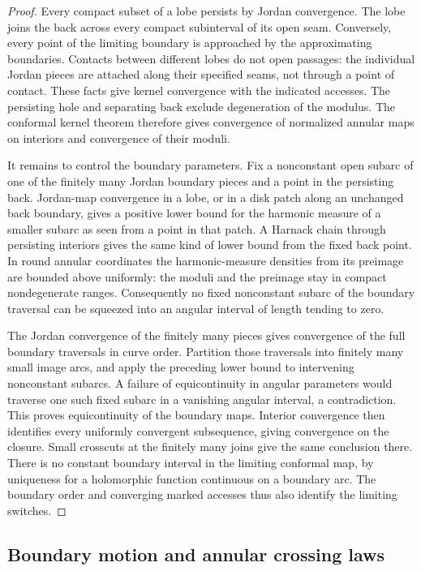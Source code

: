 \begin{proof}
Every compact subset of a lobe persists by Jordan convergence.  The lobe
joins the back across every compact subinterval of its open seam.
Conversely, every point of the limiting boundary is approached by the
approximating boundaries.  Contacts between different lobes do not open
passages: the individual Jordan pieces are attached along their specified
seams, not through a point of contact.  These facts give kernel convergence
with the indicated accesses.  The persisting hole and separating back
exclude degeneration of the modulus.  The conformal kernel theorem
therefore gives convergence of normalized annular maps on interiors and
convergence of their moduli.

It remains to control the boundary parameters.  Fix a nonconstant open
subarc of one of the finitely many Jordan boundary pieces and a point in
the persisting back.  Jordan-map convergence in a lobe, or in a disk patch
along an unchanged back boundary, gives a positive lower bound for the
harmonic measure of a smaller subarc as seen from a point in that patch.
A Harnack chain through persisting interiors gives the same kind of lower
bound from the fixed back point.  In round annular coordinates the
harmonic-measure densities from its preimage are bounded above uniformly:
the moduli and the preimage stay in compact nondegenerate ranges.
Consequently no fixed nonconstant subarc of the boundary traversal can be
squeezed into an angular interval of length tending to zero.

The Jordan convergence of the finitely many pieces gives convergence of
the full boundary traversals in curve order.  Partition those traversals
into finitely many small image arcs, and apply the preceding lower bound
to intervening nonconstant subarcs.  A failure of equicontinuity in angular
parameters would traverse one such fixed subarc in a vanishing angular
interval, a contradiction.  This proves equicontinuity of the boundary
maps.  Interior convergence then identifies every uniformly convergent
subsequence, giving convergence on the closure.  Small crosscuts at the
finitely many joins give the same conclusion there.  There is no constant
boundary interval in the limiting conformal map, by uniqueness for a
holomorphic function continuous on a boundary arc.  The boundary order
and converging marked accesses thus also identify the limiting switches.
\end{proof}

\subsection{Boundary motion and annular crossing laws}

